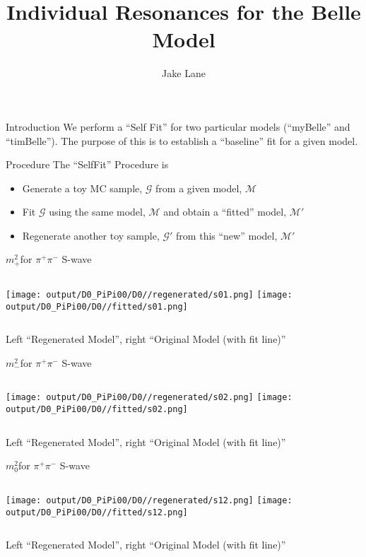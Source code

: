 \documentclass{beamer}
\author{Jake Lane}
\title{Individual Resonances for the Belle Model}
\newcommand{\MP}{\ensuremath{m^2_+}}
\newcommand{\MM}{\ensuremath{m^2_-}}
\newcommand{\MZ}{\ensuremath{m^2_0}}
\begin{document}
\begin{frame}{Introduction}
We perform a ``Self Fit'' for two particular models (``myBelle'' and ``timBelle''). 
The purpose of this is to establish a ``baseline'' fit for a given model.
\end{frame}
\begin{frame}{Procedure}
The ``SelfFit'' Procedure is
\begin{itemize}
\item Generate a toy MC sample, $\mathcal{G}$ from a given model, $\mathcal{M}$
\item Fit $\mathcal{G}$ using the same model, $\mathcal{M}$ and obtain a ``fitted'' model, $\mathcal{M}'$
\item Regenerate another toy sample, $\mathcal{G}'$ from this ``new'' model, $\mathcal{M}'$
\end{itemize}
\end{frame}

\begin{frame}{\MP for $\pi^+ \pi^-$ S-wave}
\begin{columns}[t]
\centering
\texttt{[image: output/D0\_PiPi00/D0//regenerated/s01.png]}
\centering
\texttt{[image: output/D0\_PiPi00/D0//fitted/s01.png]}
\end{columns}
    \centering
    Left ``Regenerated Model'', right ``Original Model (with fit line)''
\end{frame}                   

\begin{frame}{\MM for $\pi^+ \pi^-$ S-wave}
\begin{columns}[t]
\centering
\texttt{[image: output/D0\_PiPi00/D0//regenerated/s02.png]}
\centering
\texttt{[image: output/D0\_PiPi00/D0//fitted/s02.png]}
\end{columns}
    \centering
    Left ``Regenerated Model'', right ``Original Model (with fit line)''
\end{frame}                   

\begin{frame}{\MZ for $\pi^+ \pi^-$ S-wave}
\begin{columns}[t]
\centering
\texttt{[image: output/D0\_PiPi00/D0//regenerated/s12.png]}
\centering
\texttt{[image: output/D0\_PiPi00/D0//fitted/s12.png]}
\end{columns}
    \centering
    Left ``Regenerated Model'', right ``Original Model (with fit line)''
\end{frame}                   
\end{document}
